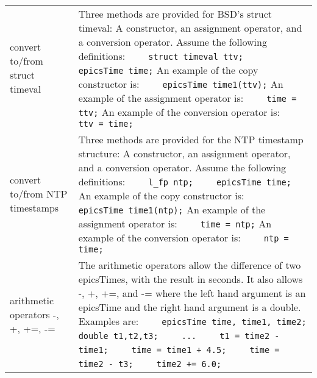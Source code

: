 \begin{center}
\begin{longtable}{p{2in}p{4.75in}}
convert to/from struct timeval &
Three methods are provided for BSD's struct timeval:
A constructor, an assignment operator, and a conversion operator.
Assume the following definitions:\newline
\verb|    struct timeval ttv;| \newline
\verb|    epicsTime time;| \newline
An example of the copy constructor is: \newline
\verb|    epicsTime time1(ttv);| \newline
An example of the assignment operator is: \newline
\verb|    time = ttv;| \newline
An example of the conversion operator is: \newline
\verb|    ttv = time;| \\

convert to/from NTP timestamps &
Three methods are provided for the NTP timestamp structure:
A constructor, an assignment operator, and a conversion operator.
Assume the following definitions:\newline
\verb|    l_fp ntp;| \newline
\verb|    epicsTime time;| \newline
An example of the copy constructor is: \newline
\verb|    epicsTime time1(ntp);| \newline
An example of the assignment operator is: \newline
\verb|    time = ntp;| \newline
An example of the conversion operator is: \newline
\verb|    ntp = time;| \\

arithmetic operators -, +, +=, -= &
The arithmetic operators allow the difference of two epicsTimes, with the result in seconds.
It also allows -, +, +=, and -= where the left hand argument is an epicsTime and the right hand argument is a double.
Examples are:\newline
\verb|    epicsTime time, time1, time2;| \newline
\verb|    double t1,t2,t3;| \newline
\verb|    ...| \newline
\verb|    t1 = time2 - time1;| \newline
\verb|    time = time1 + 4.5;| \newline
\verb|    time = time2 - t3;| \newline
\verb|    time2 += 6.0;| \\


\end{longtable}
\end{center}

